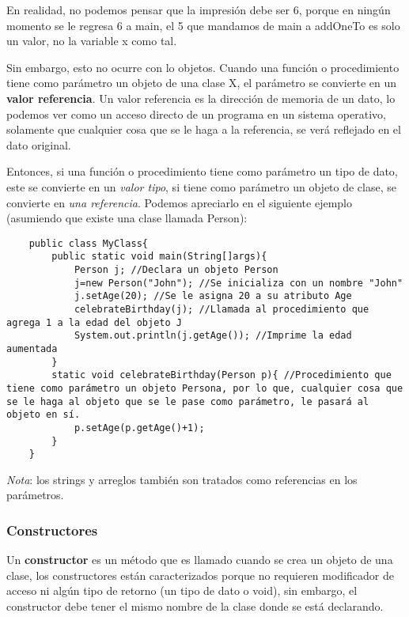 En realidad, no podemos pensar que la impresión debe ser 6, porque en ningún momento se le regresa 6 a main, el 5 que mandamos de main a addOneTo es solo un valor, no la variable x como tal.

Sin embargo, esto no ocurre con lo objetos. Cuando una función o procedimiento tiene como parámetro un objeto de una clase X, el parámetro se convierte en un \textbf{valor referencia}. Un valor referencia es la dirección de memoria de un dato, lo podemos ver como un acceso directo de un programa en un sistema operativo, solamente que cualquier cosa que se le haga a la referencia, se verá reflejado en el dato original.

Entonces, si una función o procedimiento tiene como parámetro un tipo de dato, este se convierte en un \textit{valor tipo}, si tiene como parámetro un objeto de clase, se convierte en \textit{una referencia}. Podemos apreciarlo en el siguiente ejemplo (asumiendo que existe una clase llamada Person):
\begin{lstlisting}
    public class MyClass{
        public static void main(String[]args){
            Person j; //Declara un objeto Person
            j=new Person("John"); //Se inicializa con un nombre "John"
            j.setAge(20); //Se le asigna 20 a su atributo Age
            celebrateBirthday(j); //Llamada al procedimiento que agrega 1 a la edad del objeto J
            System.out.println(j.getAge()); //Imprime la edad aumentada
        }
        static void celebrateBirthday(Person p){ //Procedimiento que tiene como parámetro un objeto Persona, por lo que, cualquier cosa que se le haga al objeto que se le pase como parámetro, le pasará al objeto en sí.
            p.setAge(p.getAge()+1);
        }
    }
\end{lstlisting}

\textit{Nota}: los strings y arreglos también son tratados como referencias en los parámetros.


\subsubsection{Constructores}
\hspace{0.55cm}Un \textbf{constructor} es un método que es llamado cuando se crea un objeto de una clase, los constructores están caracterizados porque no requieren modificador de acceso ni algún tipo de retorno (un tipo de dato o void), sin embargo, el constructor debe tener el mismo nombre de la clase donde se está declarando.

